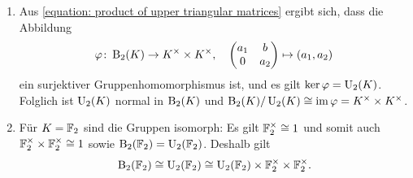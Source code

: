 \begin{solution}
\begin{enumerate}
    \item
      Aus \eqref{equation: product of upper triangular matrices} ergibt sich, dass die Abbildung
      \[
                \varphi
        \colon  \operatorname{B}_2(K) \to K^\times \times K^\times,
        \quad   \begin{pmatrix}
                  a_1 & b   \\
                  0   & a_2
                \end{pmatrix}
                \mapsto
                (a_1, a_2)
      \]
      ein surjektiver Gruppenhomomorphismus ist, und es gilt $\ker \varphi = \operatorname{U}_2(K)$.
      Folglich ist $\operatorname{U}_2(K)$ normal in $\operatorname{B}_2(K)$ und $\operatorname{B}_2(K) / \operatorname{U}_2(K) \cong \operatorname{im} \varphi = K^\times \times K^\times$.
    
    \item
      Für $K = \mathbb{F}_2$ sind die Gruppen isomorph:
      Es gilt $\mathbb{F}_2^\times \cong 1$ und somit auch $\mathbb{F}_2^\times \times \mathbb{F}_2^\times \cong 1$ sowie $\operatorname{B}_2(\mathbb{F}_2) = \operatorname{U}_2(\mathbb{F}_2)$.
      Deshalb gilt
      \[
              \operatorname{B}_2(\mathbb{F}_2)
        \cong \operatorname{U}_2(\mathbb{F}_2)
        \cong \operatorname{U}_2(\mathbb{F}_2) \times \mathbb{F}_2^\times \times \mathbb{F}_2^\times.
      \]
      

\end{enumerate}
\end{solution}
